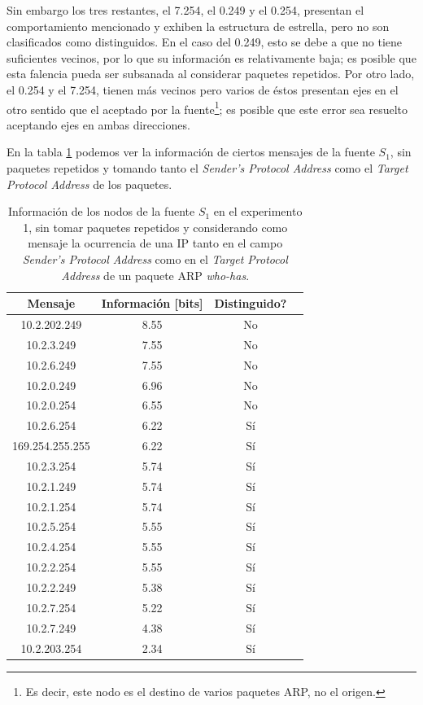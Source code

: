 \par Sin embargo los tres restantes, el 7.254, el 0.249 y el 0.254, presentan el comportamiento mencionado y exhiben la estructura de estrella, pero no son clasificados como distinguidos.
En el caso del 0.249, esto se debe a que no tiene suficientes vecinos, por lo que su información es relativamente baja; es posible que esta falencia pueda ser subsanada al considerar paquetes repetidos.
Por otro lado, el 0.254 y el 7.254, tienen más vecinos pero varios de éstos presentan ejes en el otro sentido que el aceptado por la fuente\footnote{Es decir, este nodo es el destino de varios paquetes ARP, no el origen.}; es posible que este error sea resuelto aceptando ejes en ambas direcciones.

\par En la tabla \ref{tab1A} podemos ver la información de ciertos mensajes de la fuente $S_1$, sin paquetes repetidos y tomando tanto el \textit{Sender's Protocol Address} como el \textit{Target Protocol Address} de los paquetes.

\begin{table}[t]
    \centering
    \begin{tabular}{ | c | c | c | l |}
        \hline
        Mensaje & Información [bits] & Distinguido?\\
\hline
10.2.202.249 & 8.55 & No \\
\hline
10.2.3.249 & 7.55 & No \\
\hline
10.2.6.249 & 7.55 & No \\
\hline
10.2.0.249 & 6.96 & No \\
\hline
10.2.0.254 & 6.55 & No \\
\hline
10.2.6.254 & 6.22 & Sí \\
\hline
169.254.255.255 & 6.22 & Sí \\
\hline
10.2.3.254 & 5.74 & Sí \\
\hline
10.2.1.249 & 5.74 & Sí \\
\hline
10.2.1.254 & 5.74 & Sí \\
\hline
10.2.5.254 & 5.55 & Sí \\
\hline
10.2.4.254 & 5.55 & Sí \\
\hline
10.2.2.254 & 5.55 & Sí \\
\hline
10.2.2.249 & 5.38 & Sí \\
\hline
10.2.7.254 & 5.22 & Sí \\
\hline
10.2.7.249 & 4.38 & Sí \\
\hline
10.2.203.254 & 2.34 & Sí \\
\hline
    \end{tabular} 
    \caption{Información de los nodos de la fuente $S_1$ en el experimento 1, sin tomar paquetes repetidos y considerando como mensaje la ocurrencia de una IP tanto en el campo \textit{Sender's Protocol Address} como en el \textit{Target Protocol Address} de un paquete ARP \textit{who-has}.}
    \label{tab1A}
\end{table} 

